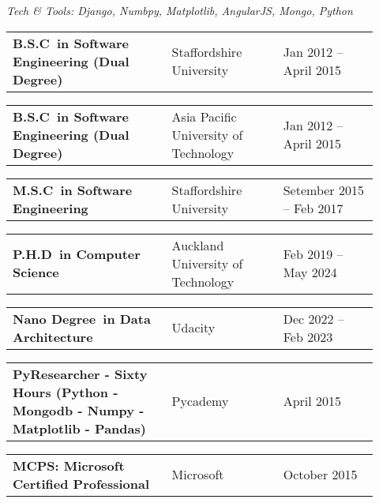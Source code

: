 \documentclass[10pt,a4paper,ragged2e,withhyper]{altacv}
\renewcommand{\cvevent}[4]{%
  \textbf{#1} %
  \hfill %
  \begin{minipage}[t]{.5\linewidth}
    \raggedleft %
    \small#3 %
    \\ %
    #4 %
  \end{minipage}
  \vspace{\baselineskip} %
}
\begin{document}
\vspace{0.5cm}

\textit{Tech \& Tools: Django, Numbpy, Matplotlib, AngularJS, Mongo, Python}


\vspace{0.5cm}



\renewcommand{\cvevent}[4]{%
  \noindent
  \begin{tabular}{@{}p{0.4\linewidth}p{0.28\linewidth}p{0.2433\linewidth}@{}}
    \small\textbf{#1} & %
    \small{#2} & %
    \raggedleft\arraybackslash\small{#3} %
  \end{tabular}
  \par %
  \vspace{0.5em} %
}








\cvevent{B.S.C\ in Software Engineering (Dual Degree)}{Staffordshire University}{Jan 2012 -- April 2015}{}

\divider

\cvevent{B.S.C\ in Software Engineering (Dual Degree)}{Asia Pacific University of Technology}{Jan 2012 -- April 2015}{}

\divider

\cvevent{M.S.C\ in Software Engineering}{Staffordshire University}{Setember 2015 -- Feb 2017}{}

\divider

\cvevent{P.H.D\ in Computer Science}{Auckland University of Technology}{Feb 2019 -- May 2024}{}

\divider

\cvevent{Nano Degree\ in Data Architecture}{Udacity}{Dec 2022 -- Feb 2023}{}



\vspace{0.5cm}


\cvevent{PyResearcher - Sixty Hours (Python - Mongodb - Numpy - Matplotlib - Pandas)}{Pycademy}{April 2015}{}

\divider

\cvevent{MCPS: Microsoft Certified Professional}{Microsoft}{October 2015}{}

\divider
\end{document}

